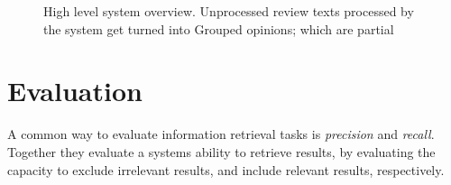 \documentclass[a4paper,11pt]{kth-mag}
\begin{document}
\begin{figure}[t]
  \centering
  \caption{High level system overview. Unprocessed review texts processed by the system
    get turned into Grouped opinions; which are partial }
  \label{fig:overview}
\end{figure}



\clearpage

\newpage
\section{Evaluation}
A common way to evaluate information retrieval tasks is \emph{precision} and \emph{recall}. Together they evaluate a systems ability to retrieve results, by evaluating the capacity to exclude irrelevant results, and include relevant results, respectively.
\end{document}

